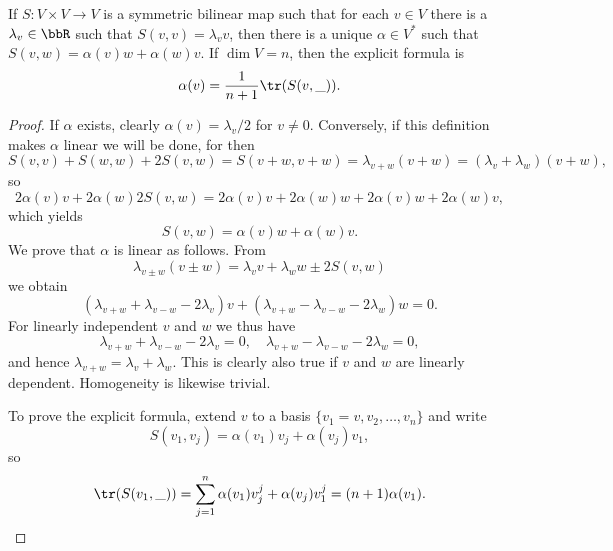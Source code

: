 \begin{lem}\label{lem 252 Spivak}
    If $S:V\times V\to V$ is a symmetric bilinear map such that for each $v\in V$ there is a $\lambda_v\in\bbR$ such that $S(v,v)=\lambda_v v$, then there is a unique $\alpha\in V^\ast$ such that $S(v,w)=\alpha(v)w+\alpha(w)v$. If $\dim V=n$, then the explicit formula is
    \[\alpha(v)=\frac{1}{n+1}\tr (S(v,\_)).\]
\end{lem}
\begin{proof}
    If $\alpha$ exists, clearly $\alpha(v)=\lambda_v/2$ for $v\neq 0$. Conversely, if this definition makes $\alpha$ linear we will be done, for then 
    \[S(v,v)+S(w,w)+2S(v,w)=S(v+w,v+w)=\lambda_{v+w}(v+w)=(\lambda_v+\lambda_w)(v+w),\]
    so 
    \[2\alpha(v)v+2\alpha(w)2S(v,w)=2\alpha(v)v+2\alpha(w)w+2\alpha(v)w+2\alpha(w)v,\]
    which yields 
    \[S(v,w)=\alpha(v)w+\alpha(w)v.\]
    We prove that $\alpha$ is linear as follows. From 
    \[\lambda_{v\pm w}(v\pm w)=\lambda_v v+\lambda_ww\pm 2S(v,w)\]
    we obtain 
    \[(\lambda_{v+w}+\lambda_{v-w}-2\lambda_v)v+(\lambda_{v+w}-\lambda_{v-w}-2\lambda_w)w=0.\]
    For linearly independent $v$ and $w$ we thus have 
    \[\lambda_{v+w}+ \lambda_{v-w}-2\lambda_v=0,\quad \lambda_{v+w}- \lambda_{v-w}-2\lambda_w=0,\]
    and hence $\lambda_{v+w}=\lambda_v+\lambda_w$. This is clearly also true if $v$ and $w$ are linearly dependent. Homogeneity is likewise trivial.

    To prove the explicit formula, extend $v$ to a basis $\{v_1=v,v_2,\ldots,v_n\}$ and write
    \[S(v_1,v_j)=\alpha(v_1)v_j+\alpha(v_j)v_1,\]
    so 
    \[\tr (S(v_1,\_))=\sum_{j=1}^n \alpha(v_1)v_j^j+\alpha(v_j)v_1^j=(n+1)\alpha(v_1).\]
\end{proof}




